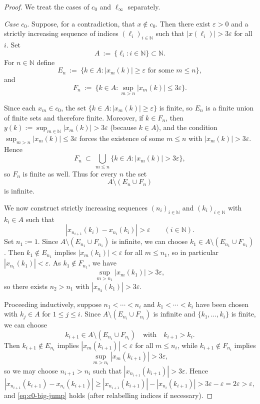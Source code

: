 \documentclass[11pt]{amsart}
\theoremstyle{definition}
\newcommand{\N}{\mathbb{N}}
\renewcommand{\le}{\leqslant}
\renewcommand{\ge}{\geqslant}
\begin{document}
\begin{proof}
We treat the cases of $c_0$ and $\ell_\infty$ separately.

\emph{Case $c_0$.}
Suppose, for a contradiction, that $x\notin c_0$. Then there exist
$\varepsilon>0$ and a strictly increasing sequence of indices
$(\ell_i)_{i\in\N}$ such that $|x(\ell_i)|>3\varepsilon$ for all $i$. Set
\[
A\ :=\ \{\ell_i:i\in\N\}\subset\N.
\]
For $n\in\N$ define
\[
E_n\ :=\ \bigl\{k\in A: |x_m(k)|\ge\varepsilon \text{ for some } m\le n\bigr\},
\]
and
\[
F_n\ :=\ \bigl\{k\in A: \sup_{m>n}|x_m(k)|\le 3\varepsilon\bigr\}.
\]

Since each $x_m\in c_0$, the set $\{k\in A:|x_m(k)|\ge\varepsilon\}$ is
finite, so $E_n$ is a finite union of finite sets and therefore finite.
Moreover, if $k\in F_n$, then $y(k):=\sup_{m\in\N}|x_m(k)|>3\varepsilon$
(because $k\in A$), and the condition $\sup_{m>n}|x_m(k)|\le 3\varepsilon$
forces the existence of some $m\le n$ with $|x_m(k)|>3\varepsilon$. Hence
\[
F_n\ \subset\ \bigcup_{m\le n}\bigl\{k\in A:|x_m(k)|>3\varepsilon\bigr\},
\]
so $F_n$ is finite as well. Thus for every $n$ the set
\[
A\setminus(E_n\cup F_n)
\]
is infinite.

We now construct strictly increasing sequences $(n_i)_{i\in\N}$ and
$(k_i)_{i\in\N}$ with $k_i\in A$ such that
\begin{equation}\label{eq:c0-big-jump}
|x_{n_{i+1}}(k_i)-x_{n_i}(k_i)|>\varepsilon\qquad(i\in\N).
\end{equation}
Set $n_1:=1$.  Since $A\setminus(E_{n_1}\cup F_{n_1})$ is infinite, we can
choose $k_1\in A\setminus(E_{n_1}\cup F_{n_1})$.  Then $k_1\notin E_{n_1}$
implies $|x_m(k_1)|<\varepsilon$ for all $m\le n_1$, so in particular
$|x_{n_1}(k_1)|<\varepsilon$.  As $k_1\notin F_{n_1}$, we have
\[
\sup_{m>n_1}|x_m(k_1)|>3\varepsilon,
\]
so there exists $n_2>n_1$ with $|x_{n_2}(k_1)|>3\varepsilon$.

Proceeding inductively, suppose $n_1<\cdots<n_i$ and $k_1<\cdots<k_i$ have
been chosen with $k_j\in A$ for $1\le j\le i$.  Since
$A\setminus(E_{n_i}\cup F_{n_i})$ is infinite and $\{k_1,\dots,k_i\}$ is
finite, we can choose
\[
k_{i+1}\in A\setminus(E_{n_i}\cup F_{n_i})
\quad\text{with}\quad k_{i+1}>k_i.
\]
Then $k_{i+1}\notin E_{n_i}$ implies
$|x_m(k_{i+1})|<\varepsilon$ for all $m\le n_i$, while
$k_{i+1}\notin F_{n_i}$ implies
\[
\sup_{m>n_i}|x_m(k_{i+1})|>3\varepsilon,
\]
so we may choose $n_{i+1}>n_i$ such that
$|x_{n_{i+1}}(k_{i+1})|>3\varepsilon$.  Hence
\[
|x_{n_{i+1}}(k_{i+1})-x_{n_i}(k_{i+1})|
\ge |x_{n_{i+1}}(k_{i+1})|-|x_{n_i}(k_{i+1})|
>3\varepsilon-\varepsilon = 2\varepsilon>\varepsilon,
\]
and \eqref{eq:c0-big-jump} holds (after relabelling indices if necessary).


\end{proof}
\end{document}
